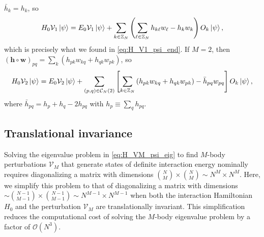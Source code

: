 \documentclass[nofootinbib,notitlepage,11pt]{revtex4-2}
\newcommand{\p}[1]{\left(#1\right)} %
\renewcommand{\sp}[1]{\left[#1\right]} %
\newcommand{\m}{\bm} %
\newcommand{\1}{\mathds{1}}
\newcommand{\C}{\mathcal{C}}
\renewcommand{\O}{\mathcal{O}}
\newcommand{\V}{\mathcal{V}}
\newcommand{\ZZ}{\mathbb{Z}}
\begin{document}
$\bar h_k=h_k$, so
\begin{align}
  H_0 \V_1 \ket\psi
  = E_0 \V_1 \ket\psi + \sum_{k\in\ZZ_N}
  \p{\sum_{\ell\in\ZZ_N} h_{k\ell} w_\ell - h_k w_k} O_k \ket\psi,
\end{align}
which is precisely what we found in \eqref{eq:H_V1_psi_end}.  If
$M=2$, then
$\p{\m h\circ\m w}_{pq}=\sum_k\p{h_{pk}w_{kq}+h_{qk}w_{pk}}$, so
\begin{align}
  H_0 \V_2 \ket\psi
  = E_0 \V_2 \ket\psi + \sum_{\p{p,q}\in\C_N\p{2}}
  \sp{\sum_{k\in\ZZ_N}\p{h_{pk} w_{kq} + h_{qk} w_{pk}}
    - \bar h_{pq} w_{pq}}
  O_k \ket\psi,
\end{align}
where $\bar h_{pq}=h_p+h_q-2h_{pq}$ with $h_p\equiv\sum_qh_{pq}$.

\subsection{Translational invariance}
\label{sec:eigenstates_TI}

Solving the eigenvalue problem in \eqref{eq:H_VM_psi_eig} to find
$M$-body perturbations $\V_M$ that generate states of definite
interaction energy nominally requires diagonalizing a matrix with
dimensions ${N\choose M}\times{N\choose M}\sim N^M\times N^M$.  Here,
we simplify this problem to that of diagonalizing a matrix with
dimensions
$\sim{N-1\choose M-1}\times{N-1\choose M-1}\sim N^{M-1}\times N^{M-1}$
when both the interaction Hamiltonian $H_0$ and the perturbation
$\V_M$ are translationally invariant.  This simplification reduces the
computational cost of solving the $M$-body eigenvalue problem by a
factor of $\O\p{N^3}$.
\end{document}
